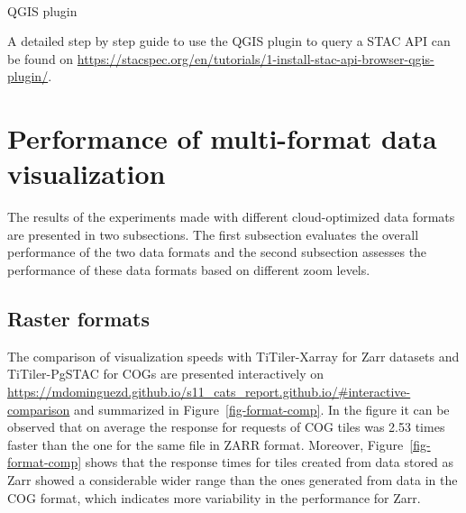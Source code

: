 \documentclass[
  oneside,
  open=any]{scrbook}
\makeatletter
\let\oldparagraph\paragraph
\renewcommand{\paragraph}{
    \@ifstar
      \xxxParagraphStar
      \xxxParagraphNoStar
  }
\newcommand{\xxxParagraphStar}[1]{\oldparagraph*{#1}\mbox{}}
\newcommand{\xxxParagraphNoStar}[1]{\oldparagraph{#1}\mbox{}}
\makeatother
\begin{document}
\paragraph{QGIS plugin}\label{qgis-plugin}

A detailed step by step guide to use the QGIS plugin to query a STAC API
can be found on
\url{https://stacspec.org/en/tutorials/1-install-stac-api-browser-qgis-plugin/}.

\section{Performance of multi-format data
visualization}\label{performance-of-multi-format-data-visualization}

The results of the experiments made with different cloud-optimized data
formats are presented in two subsections. The first subsection evaluates
the overall performance of the two data formats and the second
subsection assesses the performance of these data formats based on
different zoom levels.

\subsection{Raster formats}\label{raster-formats}

The comparison of visualization speeds with TiTiler-Xarray for Zarr
datasets and TiTiler-PgSTAC for COGs are presented interactively on
{\url{https://mdominguezd.github.io/s11_cats_report.github.io/\#interactive-comparison}}
and summarized in Figure~\ref{fig-format-comp}. In the figure it can be
observed that on average the response for requests of COG tiles was 2.53
times faster than the one for the same file in ZARR format. Moreover,
Figure~\ref{fig-format-comp} shows that the response times for tiles
created from data stored as Zarr showed a considerable wider range than
the ones generated from data in the COG format, which indicates more
variability in the performance for Zarr.
\end{document}
